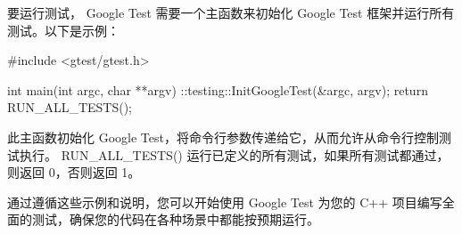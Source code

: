 要运行测试， Google Test 需要一个主函数来初始化 Google Test 框架并运行所有测试。以下是示例：

\begin{cpp}
#include <gtest/gtest.h>

int main(int argc, char **argv) {
    ::testing::InitGoogleTest(&argc, argv);
    return RUN_ALL_TESTS();
}
\end{cpp}

此主函数初始化 Google Test，将命令行参数传递给它，从而允许从命令行控制测试执行。 RUN\_ALL\_TESTS() 运行已定义的所有测试，如果所有测试都通过，则返回 0，否则返回 1。

通过遵循这些示例和说明，您可以开始使用 Google Test 为您的 C++ 项目编写全面的测试，确保您的代码在各种场景中都能按预期运行。
